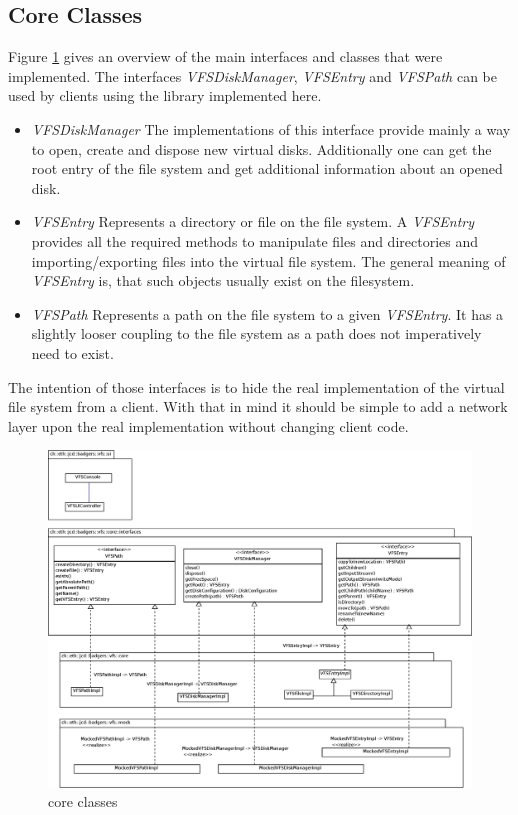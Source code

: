 
\subsection{Core Classes}\label{sec:coreClasses}
Figure \ref{fig:core_classes} gives an overview of the main interfaces and
classes that were implemented. The interfaces \textit{VFSDiskManager},
\textit{VFSEntry} and \textit{VFSPath} can be used by clients using the library
implemented here.
\begin{itemize}
\item{\textit{VFSDiskManager}} The implementations of this interface provide
mainly a way to open, create and dispose new virtual disks. Additionally one can
get the root entry of the file system and get additional information about an
opened disk.
\item{\textit{VFSEntry}} Represents a directory or file on the file system. A
\textit{VFSEntry} provides all the required methods to manipulate files and
directories and importing/exporting files into the virtual file system. The
general meaning of \textit{VFSEntry} is, that such objects usually exist on the
filesystem.
\item {\textit{VFSPath}} Represents a path on the file system to a given
\textit{VFSEntry}. It has a slightly looser coupling to the file system as a
path does not imperatively need to exist.
\end{itemize}

The intention of those interfaces is to hide the real implementation of the
virtual file system from a client. With that in mind it should be simple to add
a network layer upon the real implementation without changing client code. 

\begin{figure}[h!]
\centering
\includegraphics[width=1\textwidth]{figures/core_classes.eps}
\caption{core classes}
\label{fig:core_classes}
\end{figure}

